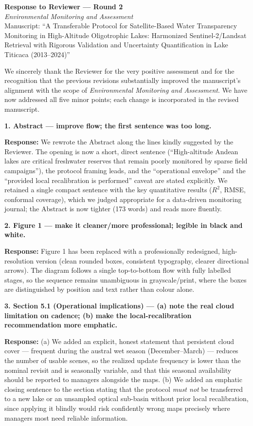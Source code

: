 \documentclass[11pt]{article}
\newcommand{\resp}[1]{\par\noindent\textcolor{blue!60!black}{\textbf{Response:}} #1\par\medskip}
\begin{document}
\begin{center}
{\large\textbf{Response to Reviewer --- Round 2}}\\[0.3em]
\textit{Environmental Monitoring and Assessment}\\[0.2em]
Manuscript: ``A Transferable Protocol for Satellite-Based Water Transparency
Monitoring in High-Altitude Oligotrophic Lakes: Harmonized Sentinel-2/Landsat
Retrieval with Rigorous Validation and Uncertainty Quantification in Lake Titicaca
(2013--2024)''
\end{center}

We sincerely thank the Reviewer for the very positive assessment and for the
recognition that the previous revisions substantially improved the manuscript's
alignment with the scope of \textit{Environmental Monitoring and Assessment}. We
have now addressed all five minor points; each change is incorporated in the
revised manuscript.

\hrulefill

\textbf{1. Abstract --- improve flow; the first sentence was too long.}
\resp{We rewrote the Abstract along the lines kindly suggested by the Reviewer. The
opening is now a short, direct sentence (``High-altitude Andean lakes are critical
freshwater reserves that remain poorly monitored by sparse field campaigns''), the
protocol framing leads, and the ``operational envelope'' and the ``provided local
recalibration is performed'' caveat are stated explicitly. We retained a single
compact sentence with the key quantitative results ($R^2$, RMSE, conformal
coverage), which we judged appropriate for a data-driven monitoring journal; the
Abstract is now tighter (173 words) and reads more fluently.}

\textbf{2. Figure 1 --- make it cleaner/more professional; legible in black and
white.}
\resp{Figure 1 has been replaced with a professionally redesigned, high-resolution
version (clean rounded boxes, consistent typography, clearer directional arrows).
The diagram follows a single top-to-bottom flow with fully labelled stages, so the
sequence remains unambiguous in grayscale/print, where the boxes are distinguished
by position and text rather than colour alone.}

\textbf{3. Section 5.1 (Operational implications) --- (a) note the real cloud
limitation on cadence; (b) make the local-recalibration recommendation more
emphatic.}
\resp{(a) We added an explicit, honest statement that persistent cloud cover ---
frequent during the austral wet season (December--March) --- reduces the number of
usable scenes, so the realized update frequency is lower than the nominal revisit
and is seasonally variable, and that this seasonal availability should be reported
to managers alongside the maps. (b) We added an emphatic closing sentence to the
section stating that the protocol \emph{must not} be transferred to a new lake or an
unsampled optical sub-basin without prior local recalibration, since applying it
blindly would risk confidently wrong maps precisely where managers most need
reliable information.}
\end{document}
